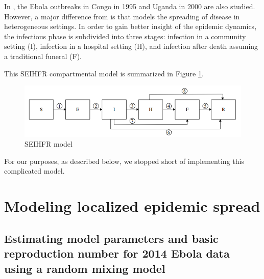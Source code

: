 \documentclass[10pt, journal,onecolumn]{IEEEtran}
\begin{document}
\label{SubSec:SEIHFR}

In \citep{legrand2007understanding}, the Ebola outbreaks in Congo in 1995 and Uganda in 2000
are also studied. However, a major difference from
\citep{chowell2004basic} is that \citep{legrand2007understanding} models the spreading of disease
in heterogeneous settings. In order to gain better insight of the epidemic dynamics,
the infectious phase is subdivided into three stages:
infection in a community setting (I), infection in a hospital setting (H), and
infection after death assuming a traditional funeral (F).

This SEIHFR compartmental model is summarized in Figure \ref{fig:SEIHFR_model}.

\begin{figure}[h!]
\centering
\includegraphics[scale=0.5]{seihfr_model_fig}
\caption{SEIHFR model}
\label{fig:SEIHFR_model}
\end{figure}

For our purposes, as described below, we stopped short of implementing this complicated model.

\bigskip





\section{Modeling localized epidemic spread}
\label{sec:IntraCountry}





\subsection*{\textbf{Estimating model parameters and basic reproduction number for 2014 Ebola data using a random mixing model}}
\end{document}

